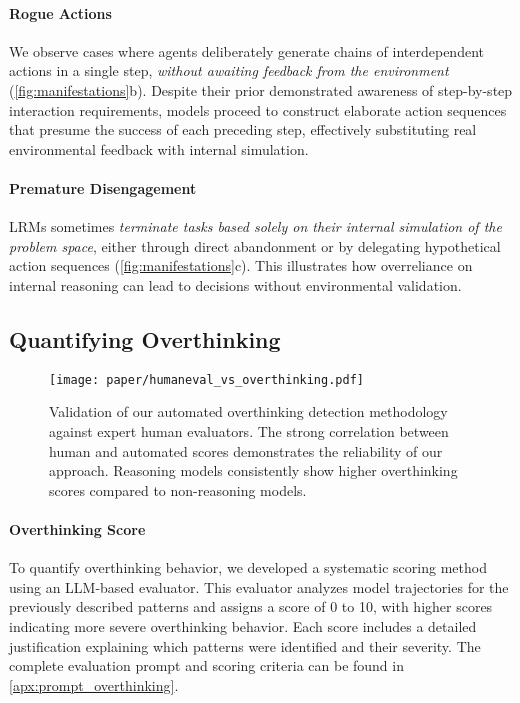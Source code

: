 \paragraph{Rogue Actions} 
We observe cases where agents deliberately generate chains of interdependent actions in a single step, \textit{without awaiting feedback from the environment} (\cref{fig:manifestations}b).
Despite their prior demonstrated awareness of step-by-step interaction requirements, models proceed to construct elaborate action sequences that presume the success of each preceding step, effectively substituting real environmental feedback with internal simulation.

\paragraph{Premature Disengagement} LRMs sometimes \textit{terminate tasks based solely on their internal simulation of the problem space}, either through direct abandonment or by delegating hypothetical action sequences (\cref{fig:manifestations}c). This illustrates how overreliance on internal reasoning can lead to decisions without environmental validation.


\subsection{Quantifying Overthinking}

\begin{figure}[t]
    \centering
    \texttt{[image: paper/humaneval\_vs\_overthinking.pdf]}
\caption{Validation of our automated overthinking detection methodology against expert human evaluators. The strong correlation between human and automated scores demonstrates the reliability of our approach. Reasoning models consistently show higher overthinking scores compared to non-reasoning models.}
    \label{fig:human_eval}
\end{figure}

\paragraph{Overthinking Score} To quantify overthinking behavior, we developed a systematic scoring method using an LLM-based evaluator. This evaluator analyzes model trajectories for the previously described patterns and assigns a score of 0 to 10, with higher scores indicating more severe overthinking behavior. Each score includes a detailed justification explaining which patterns were identified and their severity. The complete evaluation prompt and scoring criteria can be found in \cref{apx:prompt_overthinking}. 


